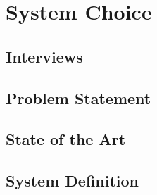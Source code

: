 \chapter{System Choice}


\section{Interviews}






\section{Problem Statement}
\label{ProblemStatement}


\section{State of the Art}
\label{StateOfTheArt}


\section{System Definition}

